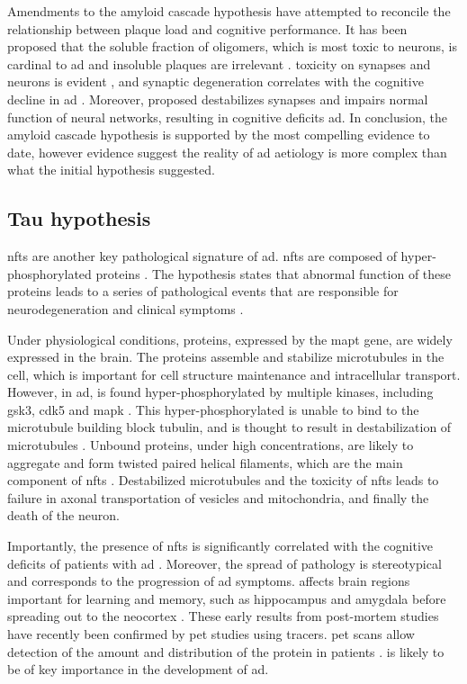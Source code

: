 Amendments to the amyloid cascade hypothesis have attempted to reconcile the relationship between plaque load and cognitive performance. It has been proposed that the soluble fraction of \abeta{} oligomers, which is most toxic to neurons, is cardinal to \gls{ad} and insoluble plaques are irrelevant \citep{ferreira15}. \abeta{} toxicity on synapses and neurons is evident \citep{ferreira15},  and synaptic degeneration correlates with the cognitive decline in \gls{ad} \citep{selkoe02, coleman04}. Moreover, \citet{canter16} proposed \abeta{} destabilizes synapses and impairs normal function of neural networks, resulting in cognitive deficits \gls{ad}. In conclusion, the amyloid cascade hypothesis is supported by the most compelling evidence to date, however evidence suggest the reality of \gls{ad} aetiology is more complex than what the initial hypothesis suggested.

\subsection{Tau hypothesis}

\Glspl{nft} are another key pathological signature of \gls{ad}. \Glspl{nft} are composed of hyper-phosphorylated \atau{} proteins \citep{grundke-iqbal86}. The \atau{} hypothesis states that abnormal function of these \atau{} proteins leads to a series of pathological events that are responsible for neurodegeneration and clinical symptoms \citep{goedert11}.

Under physiological conditions, \atau{} proteins, expressed by the \gls{mapt} gene, are widely expressed in the brain. The \atau{} proteins assemble and stabilize microtubules in the cell, which is important for cell structure maintenance and intracellular transport. However, in \gls{ad}, \atau{} is found hyper-phosphorylated by multiple kinases, including \gls{gsk3}, \gls{cdk5} and \gls{mapk} \citep{singh94}. This hyper-phosphorylated \atau{} is unable to bind to the microtubule building block tubulin, and is thought to result in destabilization of microtubules \citep{bramblett93, yoshida93, alonso94}. Unbound \atau{} proteins, under high concentrations, are likely to aggregate and form twisted paired helical filaments, which are the main component of \glspl{nft} \citep{kidd63, kuret05}. Destabilized microtubules and the toxicity of \glspl{nft} leads to failure in axonal transportation of vesicles and mitochondria, and finally the death of the neuron.

Importantly, the presence of \glspl{nft} is significantly correlated with the cognitive deficits of patients with \gls{ad} \citep{hyman12}. Moreover, the spread of \atau{} pathology is stereotypical and  corresponds to the progression of \gls{ad} symptoms. \atau{} affects brain regions important for learning and memory, such as hippocampus and amygdala before spreading out to the neocortex \citep{braak91}. These early results from post-mortem studies have recently been confirmed by \gls{pet} studies using \atau{} tracers. \gls{pet} scans allow detection of the amount and distribution of the \atau{} protein in patients \citep{ossenkoppele16, scholl16}. \atau{} is likely to be of key importance in the development of \gls{ad}.
 
